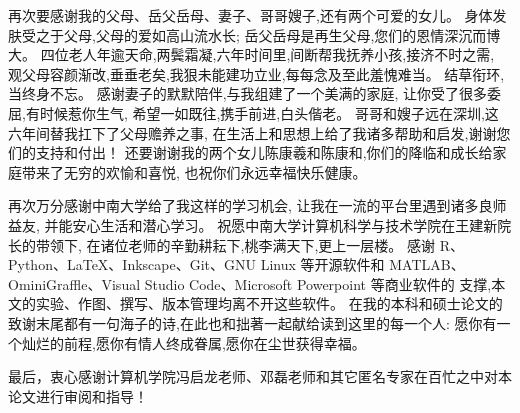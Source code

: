 再次要感谢我的父母、岳父岳母、妻子、哥哥嫂子,还有两个可爱的女儿。
身体发肤受之于父母,父母的爱如高山流水长;
岳父岳母是再生父母,您们的恩情深沉而博大。
四位老人年逾天命,两鬓霜凝,六年时间里,间断帮我抚养小孩,接济不时之需,
观父母容颜渐改,垂垂老矣,我狠未能建功立业,每每念及至此羞愧难当。
结草衔环,当终身不忘。
感谢妻子的默默陪伴,与我组建了一个美满的家庭,
让你受了很多委屈,有时候惹你生气,
希望一如既往,携手前进,白头偕老。
哥哥和嫂子远在深圳,这六年间替我扛下了父母赡养之事,
在生活上和思想上给了我诸多帮助和启发,谢谢您们的支持和付出！
还要谢谢我的两个女儿陈康羲和陈康和,你们的降临和成长给家庭带来了无穷的欢愉和喜悦,
也祝你们永远幸福快乐健康。

再次万分感谢中南大学给了我这样的学习机会, 
让我在一流的平台里遇到诸多良师益友,
并能安心生活和潜心学习。
祝愿中南大学计算机科学与技术学院在王建新院长的带领下, 
在诸位老师的辛勤耕耘下,桃李满天下,更上一层楼。
感谢 R、Python、\LaTeX、Inkscape、Git、GNU Linux 等开源软件和 MATLAB、OminiGraffle、Visual Studio Code、Microsoft Powerpoint 等商业软件的
支撑,本文的实验、作图、撰写、版本管理均离不开这些软件。
在我的本科和硕士论文的致谢末尾都有一句海子的诗,在此也和拙著一起献给读到这里的每一个人:
愿你有一个灿烂的前程,愿你有情人终成眷属,愿你在尘世获得幸福。

最后，衷心感谢计算机学院冯启龙老师、邓磊老师和其它匿名专家在百忙之中对本论文进行审阅和指导！